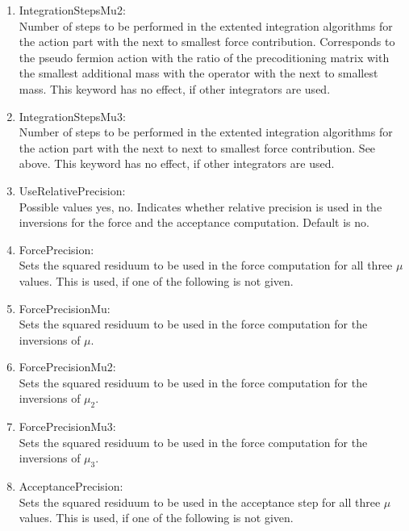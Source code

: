 \begin{enumerate}
\item {\ttfamily IntegrationStepsMu2}:\\
  Number of steps to be performed in the extented integration
  algorithms for the action part with the next to smallest force
  contribution. Corresponds to the pseudo fermion action with the
  ratio of the precoditioning matrix with the smallest additional mass
  with the operator with the next to smallest mass. This keyword has
  no effect, if other integrators are used.

\item {\ttfamily IntegrationStepsMu3}:\\
  Number of steps to be performed in the extented integration
  algorithms for the action part with the next to next to smallest force
  contribution. See above. This keyword has
  no effect, if other integrators are used.

\item {\ttfamily UseRelativePrecision}:\\
  Possible values {\ttfamily yes, no}. Indicates whether relative
  precision is used in the inversions for the force and the acceptance
  computation. Default is no.

\item {\ttfamily ForcePrecision}:\\
  Sets the squared residuum to be used in the force computation for
  all three $\mu$ values. This is used, if one of the following is not
  given.

\item {\ttfamily ForcePrecisionMu}:\\
  Sets the squared residuum to be used in the force computation for
  the inversions of $\mu$.

\item {\ttfamily ForcePrecisionMu2}:\\
  Sets the squared residuum to be used in the force computation for
  the inversions of $\mu_2$.

\item {\ttfamily ForcePrecisionMu3}:\\
  Sets the squared residuum to be used in the force computation for
  the inversions of $\mu_3$.

\item {\ttfamily AcceptancePrecision}:\\
  Sets the squared residuum to be used in the acceptance step for
  all three $\mu$ values. This is used, if one of the following is not
  given.


\end{enumerate}
